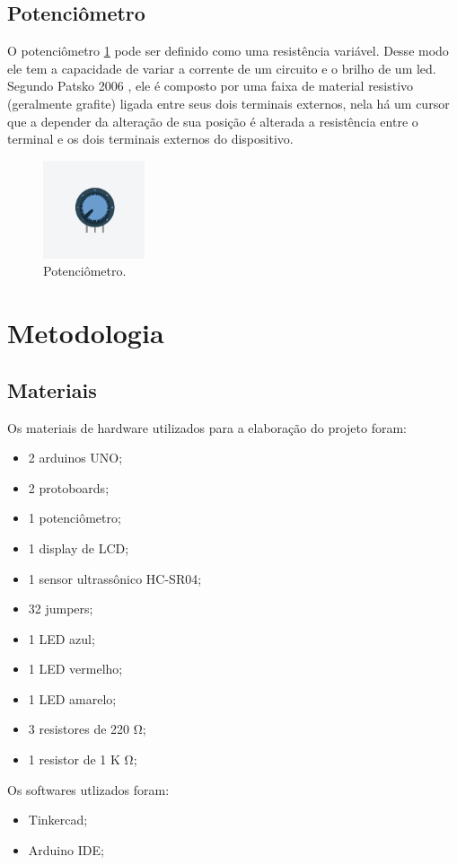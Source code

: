 \documentclass[conference]{IEEEtran}
\begin{document}
\subsection{Potenciômetro}
O potenciômetro \ref{fig:potenciometro} pode ser definido como uma resistência variável. Desse modo ele tem a capacidade de variar a corrente de um circuito e o brilho
de um led. Segundo Patsko 2006  \cite{patsko2006}, ele é composto por uma faixa de material resistivo (geralmente grafite) ligada entre seus dois terminais externos, 
nela há um cursor que a depender da alteração de sua posição é alterada a resistência entre o terminal e os dois terminais externos do dispositivo. 

\begin{figure}[htbp]
    \centerline{
        \includegraphics[width=3cm]{images/potenciometro.png}
    }
    \caption{Potenciômetro.}
    \label{fig:potenciometro}
\end{figure}

\section{Metodologia}

\subsection{Materiais}
Os materiais de hardware utilizados para a elaboração do projeto foram:
\begin{itemize}
    \item 2 arduinos UNO;
    \item 2 protoboards;
    \item 1 potenciômetro;
    \item 1 display de LCD;
    \item 1 sensor ultrassônico HC-SR04;
    \item 32 jumpers;
    \item 1 LED azul;
    \item 1 LED vermelho;
    \item 1 LED amarelo;
    \item 3 resistores de 220 \si{\ohm};
    \item 1 resistor de 1 K \si{\ohm};
\end{itemize}
Os softwares utlizados foram:
\begin{itemize}
    \item Tinkercad;
    \item Arduino IDE;
\end{itemize}
\end{document}
